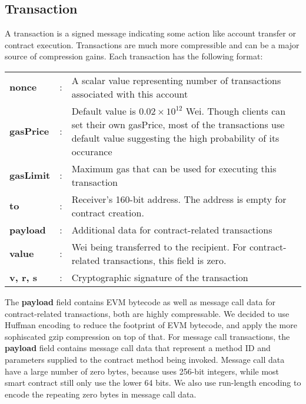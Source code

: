 \subsection{Transaction}

A transaction is a signed message indicating some action like account transfer or contract execution.
Transactions are much more compressible and can be a major source of compression gains.
Each transaction has the following format:

\begin{table}[H]
	\centering
	\begin{tabular}{>{\bfseries}l c p{}}
  nonce&:& A scalar value representing number of transactions associated with this account\\
	gasPrice&:& \par{Default value is $0.02\times10^{12}$ Wei. Though clients can set their own gasPrice, most of the transactions use default value suggesting the high probability of its occurance} \\
  gasLimit&:& Maximum gas that can be used for executing this transaction\\
  to&:& Receiver's 160-bit address. The address is empty for contract creation.\\
  payload&:& Additional data for contract-related transactions\\
  value&:& Wei being transferred to the recipient. For contract-related transactions, this field is zero.\\
  v, r, s&:& Cryptographic signature of the transaction\\
\end{tabular}
\end{table}

The \textbf{payload} field contains EVM bytecode as well as message call data for contract-related transactions,
both are highly compressable. We decided to use Huffman encoding to reduce the footprint of EVM bytecode,
and apply the more sophiscated gzip compression on top of that.
For message call transactions, the \textbf{payload} field contains message call data that represent a method ID and
parameters supplied to the contract method being invoked.
Message call data have a large number of zero bytes, because \eth{} uses 256-bit integers,
while most smart contract still only use the lower 64 bits.
We also use run-length encoding to encode the repeating zero bytes in message call data.

